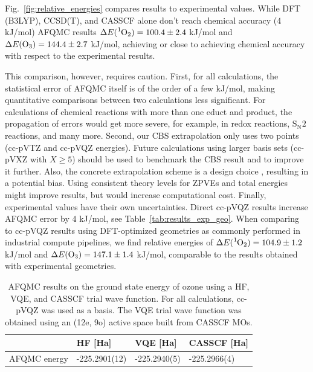 \documentclass[../main.tex]{subfiles}
\begin{document}
Fig.~\ref{fig:relative_energies} compares results to experimental values. While DFT (B3LYP), CCSD(T), and CASSCF alone don't reach chemical accuracy ($4$ kJ/mol) AFQMC results $\Delta E (\ce{^1O_2})=100.4\pm 2.4$ kJ/mol and $\Delta E (\ce{O_3})=144.4\pm 2.7$ kJ/mol, achieving or close to achieving chemical accuracy with respect to the experimental results.

This comparison, however, requires caution. First, for all calculations, the statistical error of AFQMC itself is of the order of a few kJ/mol, making quantitative comparisons between two calculations less significant. For calculations of chemical reactions with more than one educt and product, the propagation of errors would get more severe, for example, in redox reactions, $\mathrm{S_N2}$ reactions, and many more. 
Second, our CBS extrapolation only uses two points (cc-pVTZ and cc-pVQZ energies). Future calculations using larger basis sets (cc-pVXZ with $X\geq 5$) should be used to benchmark the CBS result and to improve it further. Also, the concrete extrapolation scheme is a design choice \cite{helgaker1997basis, feller2011effectiveness}, resulting in a potential bias. 
Using consistent theory levels for ZPVEs and total energies might improve results, but would increase computational cost. Finally, experimental values have their own uncertainties.
Direct cc-pVQZ results increase AFQMC error by $4$ kJ/mol, see Table~\ref{tab:results_exp_geo}. When comparing to cc-pVQZ results using DFT-optimized geometries as commonly performed in industrial compute pipelines, we find relative energies of $\Delta E (\ce{^1O_2})=104.9\pm 1.2$ kJ/mol and $\Delta E (\ce{O_3})=147.1\pm 1.4$ kJ/mol, comparable to the results obtained with experimental geometries. 

\begin{table}[]
\begin{tabular}{l|l|l|l}
& HF [Ha]     & VQE [Ha]  & CASSCF [Ha]   \\ \hline
AFQMC energy & -225.2901(12) & -225.2940(5) & -225.2966(4) 
\end{tabular}
\caption{\label{tab:ozone_vqe2}
AFQMC results on the ground state energy of ozone using a HF, VQE, and CASSCF trial wave function. For all calculations, cc-pVQZ was used as a basis. The VQE trial wave function was obtained using an (12e, 9o) active space built from CASSCF MOs.}
\end{table}
\end{document}
